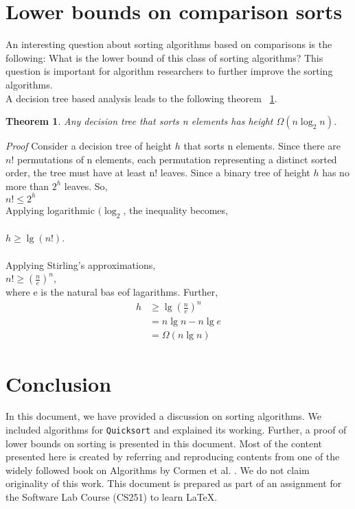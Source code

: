 \documentclass[a4paper, 11pt,twocolumn]{article}
\newtheorem{theorem}{Theorem}
\begin{document}
\section{Lower bounds on comparison sorts}
An interesting question about sorting algorithms based on comparisons is the following: What is the lower bound of this class of sorting algorithms? This question is important for algorithm researchers to further improve the sorting algorithms.\\
A decision tree based analysis leads to the following theorem ~\ref{QuickThm}.
\begin{theorem}\label{QuickThm}
Any decision tree that sorts n elements has height $\Omega (n \log_{2}n)$.
\end{theorem}
\textit{Proof} Consider a decision tree of height $h$ that sorts n elements. Since there are $n!$ permutations of n elements, each permutation representing a distinct sorted order, the tree must have at least n! leaves. Since a binary tree of height $h$ has no more than $2^h$ leaves. So,\\
$n! \leq 2^h$\\
Applying logarithmic $(\log_{2}$, the inequality becomes,\\
\\
$h \geq \lg(n!)$.\\
\\
Applying Stirling's approximations,\\
$n! \geq \left(\frac{n}{e}\right)^n$,\\
where e is the natural bas eof lagarithms. Further,\\
\begin{align*}
h & \geq \lg \left( \frac{n}{e} \right)^n\\
  & = n \lg n -n \lg e\\
   & = \Omega(n \lg n)
 \end{align*}
 
\section{Conclusion}
In this document, we have provided a discussion on sorting algorithms. We included algorithms for \texttt{Quicksort} and explained its working. Further, a proof of lower bounds on sorting is presented in this document.  Most of the content presented here is created by referring and reproducing contents from one of the widely followed book on Algorithms by Cormen et al. \cite{Cormen}. We do not claim originality of this work. This document is prepared as part of an assignment for the Software Lab Course (CS251) to learn \LaTeX.
\end{document}
